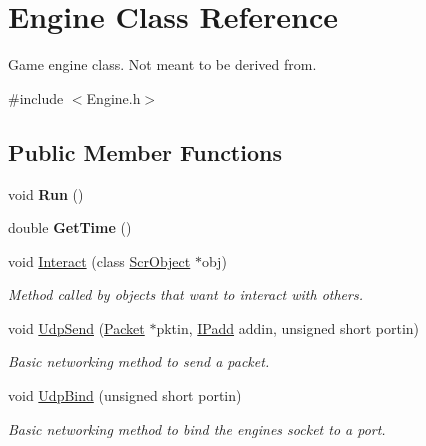 \hypertarget{class_engine}{}\section{Engine Class Reference}
\label{class_engine}


Game engine class. Not meant to be derived from.  




{\ttfamily \#include $<$Engine.\+h$>$}

\subsection*{Public Member Functions}
\begin{DoxyCompactItemize}
\item 
\hypertarget{class_engine_af4c789fb939a0870426c698a5124a0ee}{}\label{class_engine_af4c789fb939a0870426c698a5124a0ee} 
void {\bfseries Run} ()
\item 
\hypertarget{class_engine_a6eca7a961050e33cc3e801e8bd83baa4}{}\label{class_engine_a6eca7a961050e33cc3e801e8bd83baa4} 
double {\bfseries Get\+Time} ()
\item 
void \hyperlink{class_engine_a696e2de094fad8a043c105536a84754e}{Interact} (class \hyperlink{class_scr_object}{Scr\+Object} $\ast$obj)
\begin{DoxyCompactList}\small\item\em Method called by objects that want to interact with others. \end{DoxyCompactList}\item 
void \hyperlink{class_engine_a6636f2c1160776ebdcb1a07159c15e4a}{Udp\+Send} (\hyperlink{class_packet}{Packet} $\ast$pktin, \hyperlink{class_i_padd}{I\+Padd} addin, unsigned short portin)
\begin{DoxyCompactList}\small\item\em Basic networking method to send a packet. \end{DoxyCompactList}\item 
\hypertarget{class_engine_a6aaaa07c5d2706799deba2f29e88a2f7}{}\label{class_engine_a6aaaa07c5d2706799deba2f29e88a2f7} 
void \hyperlink{class_engine_a6aaaa07c5d2706799deba2f29e88a2f7}{Udp\+Bind} (unsigned short portin)
\begin{DoxyCompactList}\small\item\em Basic networking method to bind the engine\textquotesingle{}s socket to a port. \end{DoxyCompactList}\end{DoxyCompactItemize}
